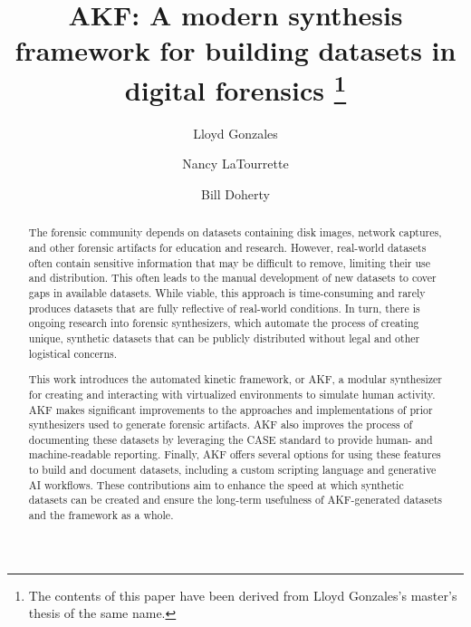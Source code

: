 \documentclass[final,5p,times,twocolumn]{elsarticle}
\begin{document}
\begin{frontmatter}

\title{AKF: A modern synthesis framework for building datasets in digital forensics
    \footnote{The contents of this paper have been derived from Lloyd Gonzales's master's thesis of the same name.}
}

\author[unr]{Lloyd Gonzales}
\author[unr]{Nancy LaTourrette}
\author[unr]{Bill Doherty}

\begin{abstract}
The forensic community depends on datasets containing disk images,
network captures, and other forensic artifacts for education and
research. However, real-world datasets often contain sensitive
information that may be difficult to remove, limiting their use and
distribution. This often leads to the manual development of new datasets
to cover gaps in available datasets. While viable, this approach is
time-consuming and rarely produces datasets that are fully reflective of
real-world conditions. In turn, there is ongoing research into forensic
synthesizers, which automate the process of creating unique, synthetic
datasets that can be publicly distributed without legal and other
logistical concerns.

This work introduces the automated kinetic framework, or AKF, a modular
synthesizer for creating and interacting with virtualized environments
to simulate human activity. AKF makes significant improvements to the
approaches and implementations of prior synthesizers used to generate
forensic artifacts. AKF also improves the process of documenting these
datasets by leveraging the CASE standard to provide human- and
machine-readable reporting. Finally, AKF offers several options for
using these features to build and document datasets, including a custom
scripting language and generative AI workflows. These contributions aim
to enhance the speed at which synthetic datasets can be created and
ensure the long-term usefulness of AKF-generated datasets and the
framework as a whole.
\end{abstract}



\end{frontmatter}
\end{document}
